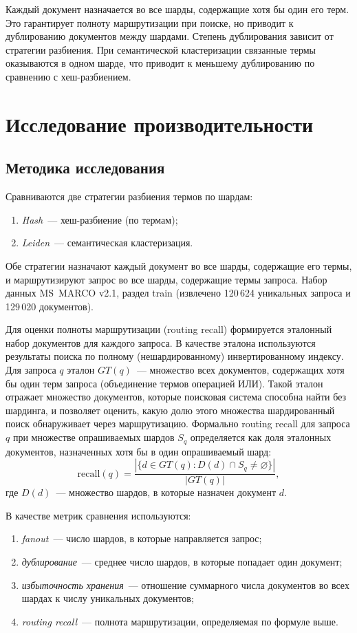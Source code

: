\documentclass[14pt, a4paper]{article}
\begin{document}
	Каждый документ назначается во все шарды, содержащие хотя бы один его терм.
	Это гарантирует полноту маршрутизации при поиске, но приводит к дублированию документов между шардами.
	Степень дублирования зависит от стратегии разбиения.
	При семантической кластеризации связанные термы оказываются в одном шарде, что приводит к меньшему дублированию по сравнению с хеш-разбиением.

	\section{Исследование производительности}

	\subsection{Методика исследования}

	Сравниваются две стратегии разбиения термов по шардам:
	\begin{enumerate}
		\item \textit{Hash}~--- хеш-разбиение (по термам);
		\item \textit{Leiden}~--- семантическая кластеризация.
	\end{enumerate}
	Обе стратегии назначают каждый документ во все шарды, содержащие его термы, и маршрутизируют запрос во все шарды, содержащие термы запроса.
	Набор данных MS~MARCO v2.1, раздел train (извлечено 120\,624 уникальных запроса и 129\,020 документов).

	Для оценки полноты маршрутизации (routing recall) формируется эталонный набор документов для каждого запроса.
	В качестве эталона используются результаты поиска по полному (нешардированному) инвертированному индексу.
	Для запроса $q$ эталон $GT(q)$~--- множество всех документов, содержащих хотя бы один терм запроса (объединение термов операцией ИЛИ).
	Такой эталон отражает множество документов, которые поисковая система способна найти без шардинга, и позволяет оценить, какую долю этого множества шардированный поиск обнаруживает через маршрутизацию.
	Формально routing recall для запроса $q$ при множестве опрашиваемых шардов $S_q$ определяется как доля эталонных документов, назначенных хотя бы в один опрашиваемый шард:
	\begin{equation}
		\mathrm{recall}(q) = \frac{|\{d \in GT(q) : D(d) \cap S_q \neq \varnothing\}|}{|GT(q)|},
	\end{equation}
	где $D(d)$~--- множество шардов, в которые назначен документ $d$.

	В качестве метрик сравнения используются:
	\begin{enumerate}
		\item \textit{fanout}~--- число шардов, в которые направляется запрос;
		\item \textit{дублирование}~--- среднее число шардов, в которые попадает один документ;
		\item \textit{избыточность хранения}~--- отношение суммарного числа документов во всех шардах к числу уникальных документов;
		\item \textit{routing recall}~--- полнота маршрутизации, определяемая по формуле выше.
	\end{enumerate}
\end{document}
